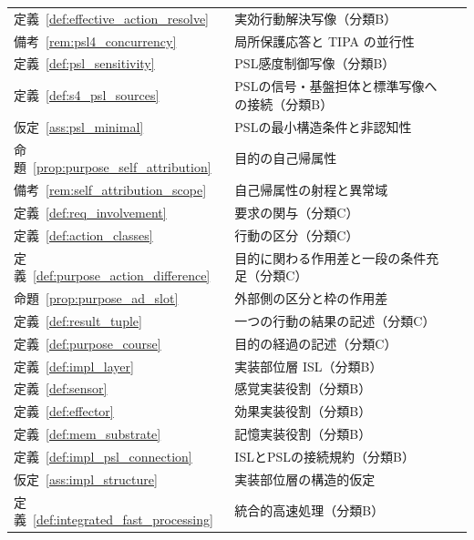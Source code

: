 \begin{longtable}{p{2.4cm} p{10.4cm} r}
定義~\ref{def:effective_action_resolve} & 実効行動解決写像（分類B） & \pageref{def:effective_action_resolve} \\
備考~\ref{rem:psl4_concurrency} & 局所保護応答と TIPA の並行性 & \pageref{rem:psl4_concurrency} \\
定義~\ref{def:psl_sensitivity} & PSL感度制御写像（分類B） & \pageref{def:psl_sensitivity} \\
定義~\ref{def:s4_psl_sources} & PSLの信号・基盤担体と標準写像への接続（分類B） & \pageref{def:s4_psl_sources} \\
仮定~\ref{ass:psl_minimal} & PSLの最小構造条件と非認知性 & \pageref{ass:psl_minimal} \\
命題~\ref{prop:purpose_self_attribution} & 目的の自己帰属性 & \pageref{prop:purpose_self_attribution} \\
備考~\ref{rem:self_attribution_scope} & 自己帰属性の射程と異常域 & \pageref{rem:self_attribution_scope} \\
定義~\ref{def:req_involvement} & 要求の関与（分類C） & \pageref{def:req_involvement} \\
定義~\ref{def:action_classes} & 行動の区分（分類C） & \pageref{def:action_classes} \\
定義~\ref{def:purpose_action_difference} & 目的に関わる作用差と一段の条件充足（分類C） & \pageref{def:purpose_action_difference} \\
命題~\ref{prop:purpose_ad_slot} & 外部側の区分と枠の作用差 & \pageref{prop:purpose_ad_slot} \\
定義~\ref{def:result_tuple} & 一つの行動の結果の記述（分類C） & \pageref{def:result_tuple} \\
定義~\ref{def:purpose_course} & 目的の経過の記述（分類C） & \pageref{def:purpose_course} \\
定義~\ref{def:impl_layer} & 実装部位層 ISL（分類B） & \pageref{def:impl_layer} \\
定義~\ref{def:sensor} & 感覚実装役割（分類B） & \pageref{def:sensor} \\
定義~\ref{def:effector} & 効果実装役割（分類B） & \pageref{def:effector} \\
定義~\ref{def:mem_substrate} & 記憶実装役割（分類B） & \pageref{def:mem_substrate} \\
定義~\ref{def:impl_psl_connection} & ISLとPSLの接続規約（分類B） & \pageref{def:impl_psl_connection} \\
仮定~\ref{ass:impl_structure} & 実装部位層の構造的仮定 & \pageref{ass:impl_structure} \\
定義~\ref{def:integrated_fast_processing} & 統合的高速処理（分類B） & \pageref{def:integrated_fast_processing} \\

\end{longtable}
